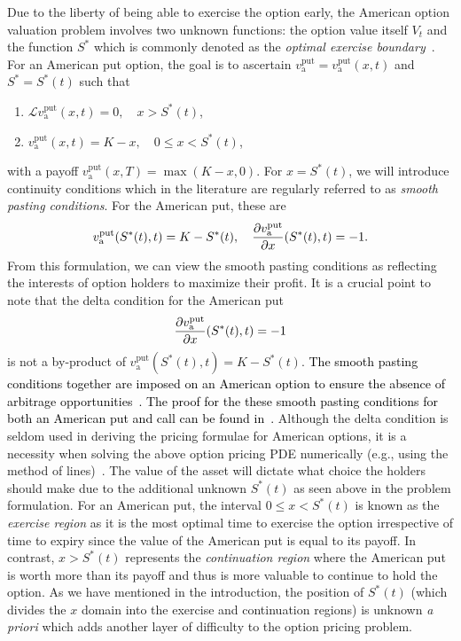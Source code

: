 Due to the liberty of being able to exercise the option early, the American option valuation problem involves two unknown functions: the option value itself $V_t$ and
the function $S^*$ which is commonly denoted as the \emph{optimal exercise boundary}~\cite{Kwok2008}. For an American put option, the goal is to ascertain
$v_\text{a}^{\text{put}} =v_\text{a}^{\text{put}}(x,t)$ and $S^* = S^*(t)$ such that
	\begin{enumerate}
			\item $\mathscr{L}v_\text{a}^{\text{put}}(x,t) = 0, \quad x > S^*(t)$,
			\item $v_\text{a}^{\text{put}}(x,t) = K - x, \quad 0 \leq x < S^*(t)$,
	\end{enumerate}
	with a payoff $v_\text{a}^{\text{put}}(x,T) = \max(K-x,0)$. For $x = S^*(t)$, we will introduce continuity conditions which in the literature are regularly referred to as \emph{smooth pasting conditions}. For the American put, these are
		\begin{equation*}
			v_\text{a}^{\text{put}}(S^*(t),t) = K - S^*(t), \quad \frac{\partial v_\text{a}^{\text{put}}}{\partial x}(S^*(t),t) = -1.
		\end{equation*}
	From this formulation, we can view the smooth pasting conditions as reflecting the interests of option holders to maximize their profit. It is a crucial point to note that the delta condition for the American put
	$$
	\frac{\partial v_\text{a}^{\text{put}}}{\partial x}(S^*(t),t) = -1
	$$
is not a by-product of $v_\text{a}^{\text{put}}(S^*(t),t) = K - S^*(t)$. \textcolor{black}{The smooth pasting conditions together are imposed on an American option to ensure the absence of arbitrage opportunities~\cite{Chiarella2014}. The proof for the these smooth pasting conditions for both an American put and call can be found in~\cite{Chin2017}.} Although the delta condition is seldom used in deriving the pricing formulae for American options, it is a necessity when solving the above option pricing PDE numerically (e.g., using the method of lines)~\cite{Chiarella2010}. The value of the asset will dictate what choice the holders should make due to the additional unknown $S^*(t)$ as seen above in the problem formulation. For an American put, the interval $0 \leq x < S^*(t)$ is known as the \emph{exercise region} as it is the most optimal time to exercise the option irrespective of time to expiry since the value of the American put is equal to its payoff. In contrast, $x > S^*(t)$ represents the \emph{continuation region} where the American put is worth more than its payoff and thus is more valuable to continue to hold the option. As we have mentioned in the introduction, the position of $S^*(t)$ (which divides the $x$ domain into the exercise and continuation regions) is unknown \emph{a priori} which adds another layer of difficulty to the option pricing problem.
	

